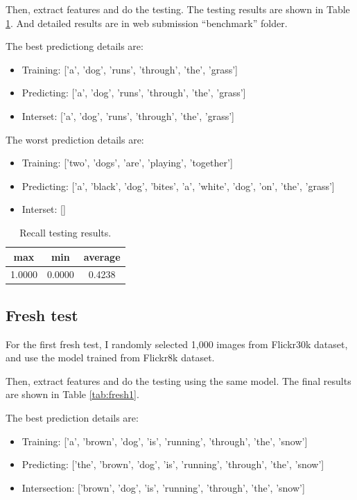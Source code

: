 \documentclass[10pt,twocolumn,letterpaper]{article}
\begin{document}
Then, extract features and do the testing. The testing results are shown in Table \ref{tab:recall}.
And detailed results are in web submission ``benchmark'' folder.

The best predictiong details are:
\begin{itemize}
    \item Training: ['a', 'dog', 'runs', 'through', 'the', 'grass']
    \item Predicting: ['a', 'dog', 'runs', 'through', 'the', 'grass']
    \item Interset: ['a', 'dog', 'runs', 'through', 'the', 'grass']
\end{itemize}

The worst prediction details are:
\begin{itemize}
    \item Training: ['two', 'dogs', 'are', 'playing', 'together']
    \item Predicting: ['a', 'black', 'dog', 'bites', 'a', 'white', 'dog', 'on', 'the', 'grass']
    \item Interset: []
\end{itemize}

\begin{table}[]
\centering
\begin{tabular}{ccc}
\hline
max    & min    & average \\ \hline
1.0000 & 0.0000 & 0.4238  \\ \hline
\end{tabular}
\caption{Recall testing results.}
\label{tab:recall}
\end{table}

\subsection{Fresh test}
For the first fresh test, I randomly selected 1,000 images from Flickr30k dataset,
and use the model trained from Flickr8k dataset.

Then, extract features and do the testing using the same model. The final results are shown in Table \ref{tab:fresh1}.

The best prediction details are:
\begin{itemize}
    \item Training: ['a', 'brown', 'dog', 'is', 'running', 'through', 'the', 'snow']
    \item Predicting: ['the', 'brown', 'dog', 'is', 'running', 'through', 'the', 'snow']
    \item Intersection: ['brown', 'dog', 'is', 'running', 'through', 'the', 'snow']
\end{itemize}
\end{document}
